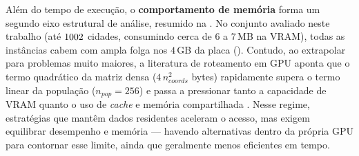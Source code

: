 Além do tempo de execução, o \textbf{comportamento de memória} forma um segundo eixo estrutural de análise, resumido na .
No conjunto avaliado neste trabalho (até \(1002\) cidades, consumindo cerca de \(6\) a \(7\)\,MB na VRAM), todas as instâncias cabem com ampla folga nos \(4\)\,GB da placa ().
Contudo, ao extrapolar para problemas muito maiores, a literatura de roteamento em GPU aponta que o termo quadrático da matriz densa (\(4\,n_{coords}^2\) bytes) rapidamente supera o termo linear da população (\(n_{pop} = 256\)) e passa a pressionar tanto a capacidade de VRAM quanto o uso de \emph{cache} e memória compartilhada \autocite{schulz2013gpu,oneil2015rethinking}.
Nesse regime, estratégias que mantêm dados residentes aceleram o acesso, mas exigem equilibrar desempenho e memória --- havendo alternativas dentro da própria GPU para contornar esse limite, ainda que geralmente menos eficientes em tempo.

